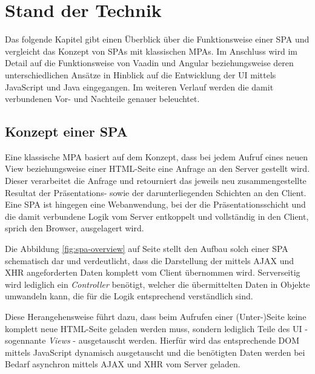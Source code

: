 \documentclass[a4paper,12pt,twoside]{scrreprt}
\begin{document}
\chapter{Stand der Technik}
\label{chap:stand-technik}
Das folgende Kapitel gibt einen Überblick über die Funktionsweise einer \ac{SPA} und vergleicht das Konzept von \acsp{SPA} mit klassischen \acp{MPA}. Im Anschluss wird im Detail auf die Funktionsweise von Vaadin und Angular beziehungsweise deren unterschiedlichen Ansätze in Hinblick auf die Entwicklung der \acs{UI} mittels JavaScript und Java eingegangen. Im weiteren Verlauf werden die damit verbundenen Vor- und Nachteile genauer beleuchtet.

\section{Konzept einer \acs{SPA}}
\label{sec:konzept-spa}
Eine klassische \ac{MPA} basiert auf dem Konzept, dass bei jedem Aufruf eines neuen View beziehungsweise einer HTML-Seite eine Anfrage an den Server gestellt wird. Dieser verarbeitet die Anfrage und retourniert das jeweils neu zusammengestellte Resultat der Präsentations- sowie der darunterliegenden Schichten an den Client. Eine \ac{SPA} ist hingegen eine Webanwendung, bei der die Präsentationsschicht und die damit verbundene Logik vom Server entkoppelt und vollständig in den Client, sprich den Browser, ausgelagert wird. \parencite[][Seite 5ff.]{scott_spa_2015}

Die Abbildung \ref{fig:spa-overview} auf Seite \pageref{fig:spa-overview} stellt den Aufbau solch einer \ac{SPA} schematisch dar und verdeutlicht, dass die Darstellung der mittels \acs{AJAX} und XHR angeforderten Daten komplett vom Client übernommen wird. Serverseitig wird lediglich ein \textit{Controller} benötigt, welcher die übermittelten Daten in Objekte umwandeln kann, die für die Logik entsprechend verständlich sind.

\medskip

Diese Herangehensweise führt dazu, dass beim Aufrufen einer (Unter-)Seite keine komplett neue HTML-Seite geladen werden muss, sondern lediglich Teile des \acl{UI} - sogennante \textit{Views} - ausgetauscht werden. Hierfür wird das entsprechende \ac{DOM} mittels JavaScript dynamisch ausgetauscht und die benötigten Daten werden bei Bedarf asynchron mittels \acs{AJAX} und XHR vom Server geladen. \parencite[][Seite 7]{scott_spa_2015}
\end{document}
